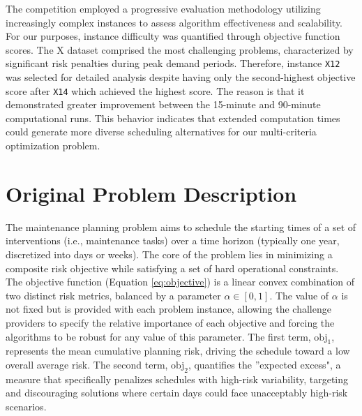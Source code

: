 The competition employed a progressive evaluation methodology utilizing increasingly complex instances to assess algorithm effectiveness and scalability. For our purposes, instance difficulty was quantified through objective function scores. The X dataset comprised the most challenging problems, characterized by significant risk penalties during peak demand periods. Therefore, instance \texttt{X12} was selected for detailed analysis despite having only the second-highest objective score after \texttt{X14} which achieved the highest score. The reason is that it demonstrated greater improvement between the 15-minute and 90-minute computational runs. This behavior indicates that extended computation times could generate more diverse scheduling alternatives for our multi-criteria optimization problem.


\section{Original Problem Description}

The maintenance planning problem aims to schedule the starting times of a set of interventions (i.e., maintenance tasks) over a time horizon (typically one year, discretized into days or weeks). The core of the problem lies in minimizing a composite risk objective while satisfying a set of hard operational constraints.\\

The objective function (Equation \ref{eq:objective}) is a linear convex combination of two distinct risk metrics, balanced by a parameter $\alpha \in [0,1]$. The value of $\alpha$ is not fixed but is provided with each problem instance, allowing the challenge providers to specify the relative importance of each objective and forcing the algorithms to be robust for any value of this parameter. The first term, $\mathrm{obj}_1$, represents the mean cumulative planning risk, driving the schedule toward a low overall average risk. The second term, $\mathrm{obj}_2$, quantifies the ''expected excess", a measure that specifically penalizes schedules with high-risk variability, targeting and discouraging solutions where certain days could face unacceptably high-risk scenarios.\\


